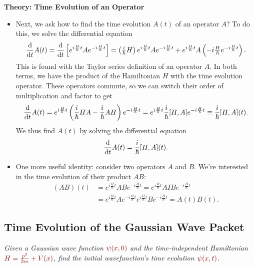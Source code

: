 \documentclass[11pt, a4paper]{article}
\newcommand{\dmath}[1]{\textcolor{Maroon}{#1}}  %
\newcommand{\tev}{e^{-i\frac{H}{\hbar}t}}  %
\newcommand{\tevp}{e^{i\frac{H}{\hbar}t}}  %
\begin{document}
\textbf{Theory: Time Evolution of an Operator}
\begin{itemize}
	\item Next, we ask how to find the time evolution $ A(t) $ of an operator $ A $? To do this, we solve the differential equation
	\begin{equation*}
		\dv{t}A(t) = \dv{t}\left[\tevp A \tev \right] = \left(\tfrac{i}{\hbar}H\right)\tevp A \tev + \tevp A\left(-i\tfrac{H}{\hbar}\tev\right).
	\end{equation*}
	This is found with the Taylor series definition of an operator $ A $. In both terms, we have the product of the Hamiltonian $ H $ with the time evolution operator. These operators commute, so we can switch their order of multiplication and factor to get
	\begin{equation*}
		\dv{t}A(t) = \tevp \left(\frac{i}{\hbar}HA - \frac{i}{\hbar}AH\right) \tev = \tevp \frac{i}{\hbar}[H, A]\tev \equiv \frac{i}{\hbar}[H, A](t).
	\end{equation*}
	We thus find $ A(t) $ by solving the differential equation
	\begin{equation*}
		\dv{t}A(t) = \frac{i}{\hbar}[H, A](t).
	\end{equation*}
	
	\item One more useful identity: consider two operators $ A $ and $ B $. We're interested in the time evolution of their product $ AB $: 
	\begin{align*}
		(AB)(t) &= \tevp AB \tev = \tevp A I B \tev\\
		&=\tevp A \tev \tevp B \tev = A(t)B(t).
	\end{align*}

\end{itemize}


\subsection{Time Evolution of the Gaussian Wave Packet}
\textit{Given a Gaussian wave function $ \dmath{\psi(x, 0)} $ and the time-independent Hamiltonian $ \dmath{H = \frac{p^{2}}{2m} + V(x)} $, find the initial wavefunction's time evolution $ \dmath{\psi(x, t)} $.}
\end{document}
